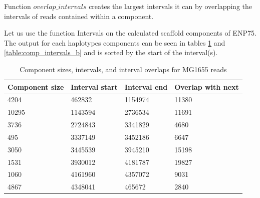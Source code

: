 Function $overlap\_intervals$ creates the largest intervals it can by overlapping the intervals of reads contained within a component.

Let us use the function Intervals on the calculated scaffold components of ENP75. The output for each haplotypes components can be seen in tables \ref{table:comp_intervals_a} and \ref{table:comp_intervals_b} and is sorted by the start of the interval(s).

\begin{table}[]
	\begin{tabular}{|l|l|l|l|}
	\hline
	\textbf{Component size} & \textbf{Interval start} & \textbf{Interval end} & \textbf{Overlap with next} \\ \hline
	4204                    & 462832                  & 1154974               & 11380                      \\ \hline
	10295                   & 1143594                 & 2736534               & 11691                      \\ \hline
	3736                    & 2724843                 & 3341829               & 4680                       \\ \hline
	495                     & 3337149                 & 3452186               & 6647                       \\ \hline
	3050                    & 3445539                 & 3945210               & 15198                      \\ \hline
	1531                    & 3930012                 & 4181787               & 19827                      \\ \hline
	1060                    & 4161960                 & 4357072               & 9031                       \\ \hline
	4867                    & 4348041                 & 465672                & 2840                       \\ \hline
	\end{tabular}
\caption{Component sizes, intervals, and interval overlaps for MG1655 reads}
\label{table:comp_intervals_a}
\end{table}

